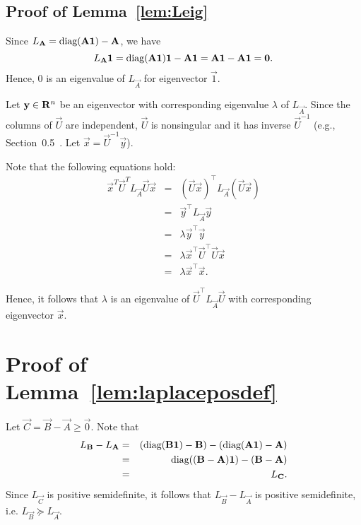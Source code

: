 \subsection{Proof of Lemma~\ref{lem:Leig}}

Since $L_{\vec{A}} = \hbox{diag}(\vec{A}\vec{1}) - \vec{A}$, we have
$$
L_{\vec{A}} \vec{1} = \hbox{diag}(\vec{A}\vec{1})\vec{1} - \vec{A}\vec{1} = \vec{A}\vec{1} - \vec{A}\vec{1} = \vec{0}.
$$
Hence, $0$ is an eigenvalue of $L_{\vec{A}}$ for eigenvector $\vec{1}$.

Let $\vec{y}\in \reals^{n}$ be an eigenvector with corresponding eigenvalue $\lambda$ of $L_{\vec{A}}$. Since the columns of $\vec{U}$ are independent, $\vec{U}$ is nonsingular and it has inverse $\vec{U}^{-1}$ (e.g., Section~0.5~\cite{horn}. Let $\vec{x} = \vec{U}^{-1}\vec{y}$). 

Note that the following equations hold:
\begin{eqnarray*}
\vec{x}^T \vec{U}^T L_{\vec{A}} \vec{U}\vec{x} &=& (\vec{U}\vec{x})^\top L_{\vec{A}} (\vec{U}\vec{x})\\
&=& \vec{y}^\top L_{\vec{A}} \vec{y}\\
&=&  \lambda \vec{y}^\top\vec{y}\\
&=&  \lambda \vec{x}^\top \vec{U}^\top \vec{U}\vec{x}\\
&=& \lambda \vec{x}^\top \vec{x}.
\end{eqnarray*}

Hence, it follows that $\lambda$ is an eigenvalue of $\vec{U}^\top L_{\vec{A}} \vec{U}$ with corresponding eigenvector $\vec{x}$. 

\section{Proof of Lemma~\ref{lem:laplaceposdef}}

Let $\vec{C} = \vec{B}-\vec{A} \geq \vec{0}$. Note that 
\begin{eqnarray*}
L_{\vec{B}} - L_{\vec{A}} &=& (\hbox{diag}(\vec{B}\vec{1}) - \vec{B}) - (\hbox{diag}(\vec{A}\vec{1}) - \vec{A})\\
&=& \hbox{diag}((\vec{B}-\vec{A})\vec{1}) - (\vec{B}-\vec{A})\\
&=& L_{\vec{C}}. 
\end{eqnarray*}
Since $L_{\vec{C}}$ is positive semidefinite, it follows that $L_{\vec{B}} - L_{\vec{A}}$ is positive semidefinite, i.e. $L_{\vec{B}}\succeq L_{\vec{A}}$.


